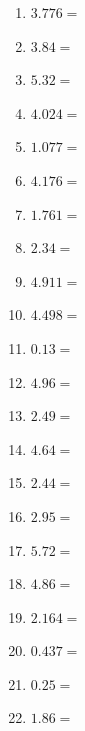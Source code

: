 \documentclass[12pt]{article}
\begin{document}
\begin{enumerate}
\item \large $ 3.776 = $ \vspace{1.3cm}
\item \large $ 3.84 = $ \vspace{1.3cm}
\item \large $ 5.32 = $ \vspace{1.3cm}
\item \large $ 4.024 = $ \vspace{1.3cm}
\item \large $ 1.077 = $ \vspace{1.3cm}
\item \large $ 4.176 = $ \vspace{1.3cm}
\item \large $ 1.761 = $ \vspace{1.3cm}
\item \large $ 2.34 = $ \vspace{1.3cm}
\item \large $ 4.911 = $ \vspace{1.3cm}
\item \large $ 4.498 = $ \vspace{1.3cm}
\newpage
\item \large $ 0.13 = $ \vspace{1.5cm}
\item \large $ 4.96 = $ \vspace{1.5cm}
\item \large $ 2.49 = $ \vspace{1.5cm}
\item \large $ 4.64 = $ \vspace{1.5cm}
\item \large $ 2.44 = $ \vspace{1.5cm}
\item \large $ 2.95 = $ \vspace{1.5cm}
\item \large $ 5.72 = $ \vspace{1.5cm}
\item \large $ 4.86 = $ \vspace{1.5cm}
\item \large $ 2.164 = $ \vspace{1.5cm}
\item \large $ 0.437 = $ \vspace{1.5cm}
\newpage
\item \large $ 0.25 = $ \vspace{1.5cm}
\item \large $ 1.86 = $ \vspace{1.5cm}

\end{enumerate}
\end{document}
